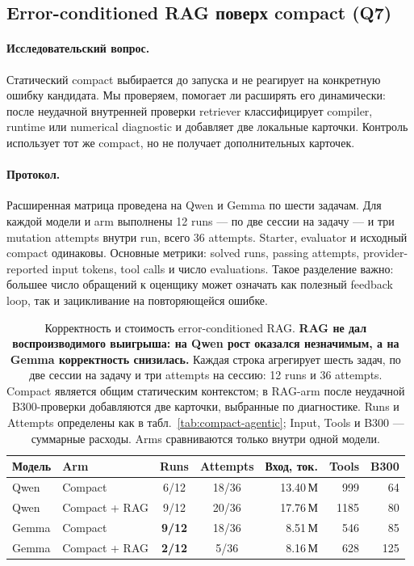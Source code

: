 \documentclass[10pt,a4paper]{article}
\begin{document}
\subsection{Error-conditioned RAG поверх compact (Q7)}

\paragraph{Исследовательский вопрос.}
Статический compact выбирается до запуска и не реагирует на конкретную ошибку
кандидата. Мы проверяем, помогает ли расширять его динамически: после
неудачной внутренней проверки retriever классифицирует compiler, runtime или
numerical diagnostic и добавляет две локальные карточки. Контроль использует
тот же compact, но не получает дополнительных карточек.

\paragraph{Протокол.}
Расширенная матрица проведена на Qwen и Gemma по шести задачам. Для каждой
модели и arm выполнены 12 runs --- по две сессии на задачу --- и три mutation
attempts внутри run, всего 36 attempts. Starter, evaluator и исходный compact
одинаковы. Основные метрики: solved runs, passing attempts, provider-reported
input tokens, tool calls и число evaluations. Такое разделение важно:
большее число обращений к оценщику может означать как полезный feedback loop,
так и зацикливание на повторяющейся ошибке.

\begin{table}[h]
\centering\footnotesize
\caption{Корректность и стоимость error-conditioned RAG. \textbf{RAG не дал воспроизводимого выигрыша: на Qwen рост оказался незначимым, а на Gemma корректность снизилась.}  Каждая строка агрегирует шесть задач, по две сессии на задачу и три attempts на сессию: 12 runs и 36 attempts. Compact является общим статическим контекстом; в RAG-arm после неудачной B300-проверки добавляются две карточки, выбранные по диагностике. Runs и Attempts определены как в табл.~\ref{tab:compact-agentic}; Input, Tools и B300 --- суммарные расходы. Arms сравниваются только внутри одной модели.}
\label{tab:error-rag}
\begin{tabular}{llccrrr}
\toprule
Модель & Arm & Runs & Attempts & Вход, ток. & Tools & B300 \\
\midrule
Qwen  & Compact         & 6/12 & 18/36 & 13.40\,М & 999  & 64 \\
Qwen  & Compact + RAG   & 9/12 & 20/36 & 17.76\,М & 1185 & 80 \\
Gemma & Compact         & \textbf{9/12} & 18/36 & 8.51\,М  & 546  & 85 \\
Gemma & Compact + RAG   & \textbf{2/12} & 5/36  & 8.16\,М  & 628  & 125 \\
\bottomrule
\end{tabular}
\end{table}
\end{document}
